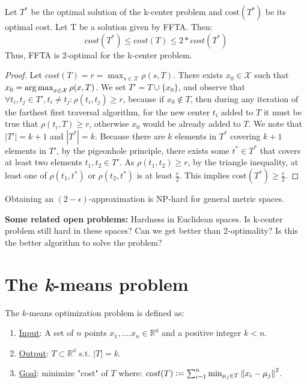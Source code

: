 \begin{theorem}
Let $T^*$ be the optimal solution of the k-center problem and
$\mathrm{cost}(T^*)$ be its optimal cost. Let T be a solution given
by FFTA. Then: 
\[cost(T^*) \le cost(T) \le 2 * cost(T^*)\]
Thus, FFTA is 2-optimal for the k-center problem. 
\end{theorem} 

\begin{proof}
Let $ cost(T) = r = \max_{s \in \mathcal{X}} \rho(s,T) $. There exists
$x_0 \in \mathcal{X}$ such that $x_0 = \operatorname*{\mathrm{arg\,max}}_{x \in\mathcal{X}}
\rho(x,T)$. We set $T' = T \cup \{x_0\} $, and observe that $\forall
t_i, t_j \in T', t_i \ne t_j : \rho(t_i,t_j) \ge r$, because if $x_0
\notin T$, then during any iteration of the farthest first traversal
algorithm, for the new center $t_i$ added to $T$ it must be true that
$\rho(t_i, T) \geq r$, otherwise $x_0$ would be already added to $T$.
We note that $|T'| = k+1$ and $ |T^*| = k$. Because there are $k$
elements in $T^*$ covering $k+1$ elements in $T'$, by the pigeonhole
principle, there exists some $t^* \in T^*$ that covers at least two
elements $t_1,t_2 \in T'$. As $\rho(t_1,t_2) \geq r$, by the triangle
inequality, at least one of $\rho(t_1,t^*)$ or $\rho(t_2,t^*)$ is at
least $\frac{r}{2}$. This implies $\mathrm{cost}(T^*)\geq\frac{r}{2}$.
\end{proof}

\begin{remark}
Obtaining an $(2 - \epsilon)$-approximation is NP-hard for general
metric spaces.
\end{remark}

\noindent\textbf{Some related open problems:} Hardness in Euclidean
spaces. Is k-center problem still hard in these spaces? Can we get
better than 2-optimality? Is this the better algorithm to solve the
problem? 

\section{The \emph{k}-means problem}
The $k$-means optimization problem is defined as:
\begin{enumerate}
\item \underline{Input}: A set of $n$ points $x_1,....x_n \in
\mathbb{R^d}$ and a positive integer $k<n$.
\item \underline{Output}: $T \subset  \mathbb{R^d}$ s.t. $|T|=k$. 
\item \underline{Goal}: minimize "cost" of $T$ where: $cost(T) 
:= \sum_{i = 1}^{n} \min_{\mu_j \in T} \left\lVert x_i-\mu_j\right\rVert^2 $.
\end{enumerate}

